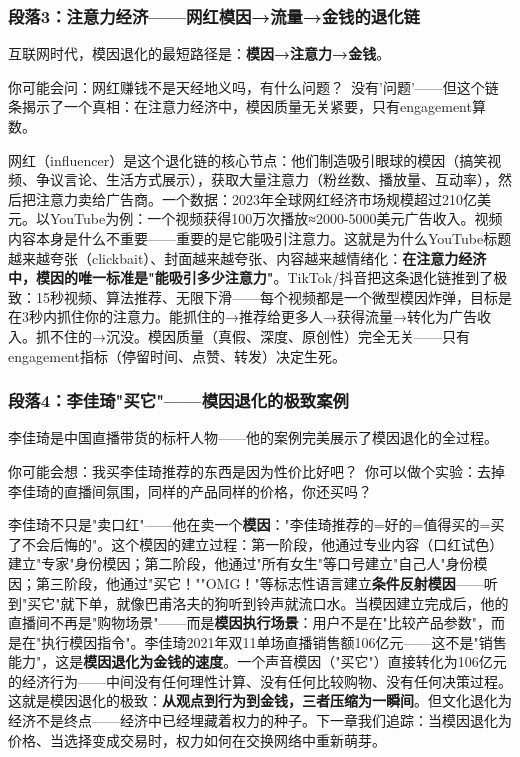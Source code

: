 \documentclass[../main.tex]{subfiles}
\begin{document}
	\subsubsection*{段落3：注意力经济——网红模因→流量→金钱的退化链}

	互联网时代，模因退化的最短路径是：\textbf{模因→注意力→金钱}。

	\begin{tcolorbox}[colback=yellow!5, title=\textit{读者行为预测}]

		你可能会问：网红赚钱不是天经地义吗，有什么问题？\ 没有'问题'——但这个链条揭示了一个真相：在注意力经济中，模因质量无关紧要，只有engagement算数。

	\end{tcolorbox}

网红（influencer）是这个退化链的核心节点：他们制造吸引眼球的模因（搞笑视频、争议言论、生活方式展示），获取大量注意力（粉丝数、播放量、互动率），然后把注意力卖给广告商。一个数据：2023年全球网红经济市场规模超过210亿美元。以YouTube为例：一个视频获得100万次播放≈2000-5000美元广告收入。视频内容本身是什么不重要——重要的是它能吸引注意力。这就是为什么YouTube标题越来越夸张（clickbait）、封面越来越夸张、内容越来越情绪化：\textbf{在注意力经济中，模因的唯一标准是"能吸引多少注意力"}。TikTok/抖音把这条退化链推到了极致：15秒视频、算法推荐、无限下滑——每个视频都是一个微型模因炸弹，目标是在3秒内抓住你的注意力。能抓住的→推荐给更多人→获得流量→转化为广告收入。抓不住的→沉没。模因质量（真假、深度、原创性）完全无关——只有engagement指标（停留时间、点赞、转发）决定生死。

	\subsubsection*{段落4：李佳琦"买它"——模因退化的极致案例}

	李佳琦是中国直播带货的标杆人物——他的案例完美展示了模因退化的全过程。

	\begin{tcolorbox}[colback=yellow!5, title=\textit{读者行为预测}]

		你可能会想：我买李佳琦推荐的东西是因为性价比好吧？\ 你可以做个实验：去掉李佳琦的直播间氛围，同样的产品同样的价格，你还买吗？

	\end{tcolorbox}

李佳琦不只是"卖口红"——他在卖一个\textbf{模因}："李佳琦推荐的=好的=值得买的=买了不会后悔的"。这个模因的建立过程：第一阶段，他通过专业内容（口红试色）建立"专家"身份模因；第二阶段，他通过"所有女生"等口号建立"自己人"身份模因；第三阶段，他通过"买它！""OMG！"等标志性语言建立\textbf{条件反射模因}——听到"买它"就下单，就像巴甫洛夫的狗听到铃声就流口水。当模因建立完成后，他的直播间不再是"购物场景"——而是\textbf{模因执行场景}：用户不是在"比较产品参数"，而是在"执行模因指令"。李佳琦2021年双11单场直播销售额106亿元——这不是"销售能力"，这是\textbf{模因退化为金钱的速度}。一个声音模因（"买它"）直接转化为106亿元的经济行为——中间没有任何理性计算、没有任何比较购物、没有任何决策过程。这就是模因退化的极致：\textbf{从观点到行为到金钱，三者压缩为一瞬间}。但文化退化为经济不是终点——经济中已经埋藏着权力的种子。下一章我们追踪：当模因退化为价格、当选择变成交易时，权力如何在交换网络中重新萌芽。
\end{document}
